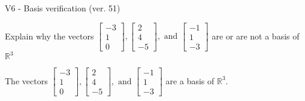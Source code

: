 \begin{exercise}
  \begin{exerciseTitle}V6 - Basis verification (ver. 51)\end{exerciseTitle}
  \begin{exerciseStatement}
    Explain why the vectors \(\left[\begin{array}{r}
-3 \\
1 \\
0
\end{array}\right] , \left[\begin{array}{r}
2 \\
4 \\
-5
\end{array}\right] , \text{ and } \left[\begin{array}{r}
-1 \\
1 \\
-3
\end{array}\right]\) are or are not a basis of \(\mathbb{R}^3\)	


  \end{exerciseStatement}
  \begin{exerciseAnswer}
   The vectors \(\left[\begin{array}{r}
-3 \\
1 \\
0
\end{array}\right] , \left[\begin{array}{r}
2 \\
4 \\
-5
\end{array}\right] , \text{ and } \left[\begin{array}{r}
-1 \\
1 \\
-3
\end{array}\right]\) 
  	 are  a basis of \(\mathbb{R}^3\).
  


  \end{exerciseAnswer}
\end{exercise}